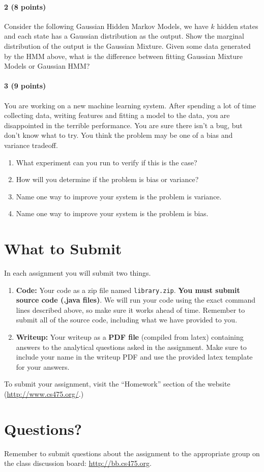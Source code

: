 \documentclass[11pt]{article}
\begin{document}
\paragraph{2 (8 points)}
Consider the following Gaussian Hidden Markov Models, we have $k$ hidden states and each state has a Gaussian distribution as the output. Show the marginal distribution of the output is the Gaussian Mixture. Given some data generated by the HMM above, what is the difference between fitting Gaussian Mixture Models or Gaussian HMM?

\paragraph{3 (9 points)} You are working on a new machine learning system. After spending a lot of time collecting data, writing features and fitting a model to the data, you are disappointed in the terrible performance. You are sure there isn't a bug, but don't know what to try. You think the problem may be one of a bias and variance tradeoff.
\begin{enumerate}
\item What experiment can you run to verify if this is the case?
\item How will you determine if the problem is bias or variance?
\item Name one way to improve your system is the problem is variance.
\item Name one way to improve your system is the problem is bias.
\end{enumerate}

\section{What to Submit}
In each assignment you will submit two things.
\begin{enumerate}
\item {\bf Code:} Your code as a zip file named {\tt library.zip}. {\bf You must submit source code (.java files)}. We will run your code using the exact command lines described above, so make sure it works ahead of time. Remember to submit all of the source code, including what we have provided to you.
\item {\bf Writeup:} Your writeup as a {\bf PDF file} (compiled from latex) containing answers to the analytical questions asked in the assignment. Make sure to include your name in the writeup PDF and use the provided latex template for your answers.
\end{enumerate}

To submit your assignment, visit the ``Homework'' section of the website (\href{http://www.cs475.org/}{http://www.cs475.org/}.)

\section{Questions?}
Remember to submit questions about the assignment to the appropriate group on the class discussion board: \href{http://bb.cs475.org/}{http://bb.cs475.org}.
\end{document}
